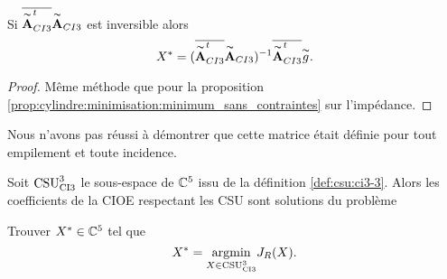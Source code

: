     \begin{prop}
      Si \(\conj{\tilde{\mA}_{CI3}^t}\tilde{\mA}_{CI3}\) est inversible alors
      \begin{equation*}
        X^* = (\conj{\tilde{\mA}_{CI3}^t}\tilde{\mA}_{CI3})^{-1}\conj{\tilde{\mA}_{CI3}^t}\tilde{g}.
      \end{equation*}
    \end{prop}
    \begin{proof}
      Même méthode que pour la proposition \ref{prop:cylindre:minimisation:minimum_sans_contraintes} sur l'impédance.
    \end{proof}

    Nous n'avons pas réussi à démontrer que cette matrice était définie pour tout empilement et toute incidence.

    \begin{defn}

      Soit \(\CSU[3]{CI3}\) le sous-espace de \(\CC^5\) issu de la définition \ref{def:csu:ci3-3}.
      Alors les coefficients de la CIOE respectant les CSU sont solutions du problème

      Trouver \(X^* \in \CC^5\) tel que
      \begin{equation*}
        X^* = \argmin{X\in \CSU[3]{CI3}} J_R(X).
      \end{equation*}
    \end{defn}

